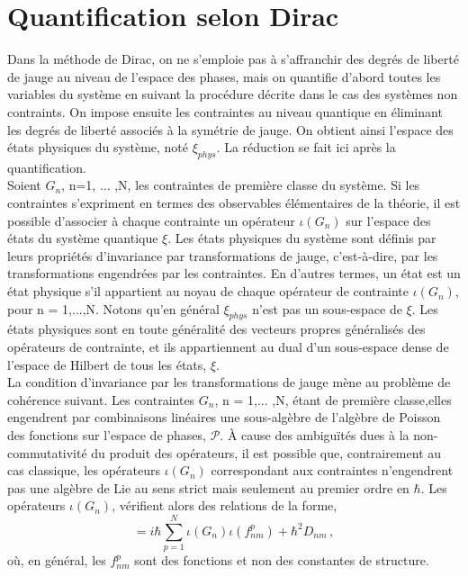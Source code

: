 \documentclass[12pt,a4paper, openany]{report}
\begin{document}
\section{Quantification selon Dirac}
Dans la méthode de Dirac, on ne s’emploie pas à s’affranchir des degrés de liberté de jauge au niveau de l'espace des phases, mais on quantifie d’abord toutes les variables du système en suivant la procédure décrite dans le cas des systèmes non contraints. On impose ensuite les contraintes au niveau quantique en éliminant les degrés de liberté associés à la symétrie de jauge. On obtient ainsi l'espace des états physiques du système, noté $\xi_{phys}$. La réduction se fait ici après la quantiﬁcation.\\ Soient $ G_n $, n=1, ... ,N, les contraintes de première classe du système. Si les \\ contraintes s'expriment en termes des observables élémentaires de la théorie, il est possible d'associer à chaque contrainte un opérateur $\iota(G_n) $ sur l'espace des états du système quantique $\xi$. Les états physiques du système sont définis par leurs propriétés d’invariance par transformations de jauge, c’est-à-dire, par les transformations engendrées par les contraintes. En d’autres termes, un état est un état physique s’il appartient au noyau de chaque opérateur de contrainte $\iota(G_n) $, pour n = 1,...,N. Notons qu'en général $\xi_{phys}$ n'est pas un sous-espace de $\xi$. Les états physiques sont en toute généralité des vecteurs propres généralisés des opérateurs de contrainte, et ils appartiennent au dual d’un sous-espace dense de l’espace de Hilbert de tous les états, $\xi$.\\ La condition d’invariance par les transformations de jauge mène au problème de cohérence suivant. Les contraintes $G_n$, n = 1,... ,N, étant de première classe,elles engendrent par combinaisons linéaires une sous-algèbre de l’algèbre de Poisson des fonctions sur l’espace de phases, $\mathcal{P}$. À cause des ambiguïtés dues à la non-commutativité du produit des opérateurs, il est possible que, contrairement au cas classique, les opérateurs $\iota(G_n) $ correspondant aux contraintes n'engendrent pas une algèbre de Lie au sens strict mais seulement au premier ordre en $\hbar$. Les opérateurs $\iota(G_n) $,  vérifient alors des relations de la forme,
\begin{equation}
	[\iota(G_n),\iota(G_m)]=i{\hbar}\sum_{p=1}^{N}\iota(G_n)\iota(f_{nm}^p)	+{\hbar}^2D_{nm}\,,
\end{equation}
o\`{u}, en général, les $f_{nm}^p$ sont des fonctions et non des constantes de structure.\\
\end{document}
